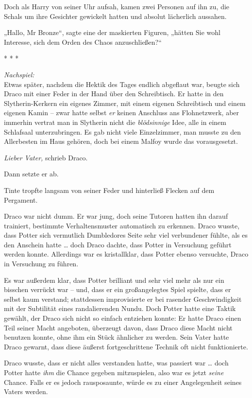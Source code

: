 {Doch als Harry von seiner Uhr aufsah, kamen zwei Personen auf ihn zu, die Schals um ihre Gesichter gewickelt hatten und absolut lächerlich aussahen.

„Hallo, Mr Bronze“, sagte eine der maskierten Figuren, „hätten Sie wohl Interesse, sich dem Orden des Chaos anzuschließen?“

* * *

\emph{Nachspiel:}\\ Etwas später, nachdem die Hektik des Tages endlich abgeflaut war, beugte sich Draco mit einer Feder in der Hand über den Schreibtisch. Er hatte in den Slytherin-Kerkern ein eigenes Zimmer, mit einem eigenen Schreibtisch und einem eigenen Kamin -- zwar hatte selbst \emph{er} keinen Anschluss ans Flohnetzwerk, aber immerhin vertrat man in Slytherin nicht die \emph{blödsinnige} Idee, alle in einem Schlafsaal unterzubringen. Es gab nicht viele Einzelzimmer, man musste zu den Allerbesten im Haus gehören, doch bei einem Malfoy wurde das vorausgesetzt.

\emph{Lieber Vater,} schrieb Draco.

Dann setzte er ab.

Tinte tropfte langsam von seiner Feder und hinterließ Flecken auf dem Pergament.

Draco war nicht dumm. Er war jung, doch seine Tutoren hatten ihn darauf trainiert, bestimmte Verhaltensmuster automatisch zu erkennen. Draco wusste, dass Potter sich vermutlich Dumbledores Seite sehr viel verbundener fühlte, als es den Anschein hatte … doch Draco dachte, dass Potter in Versuchung geführt werden konnte. Allerdings war es kristallklar, dass Potter ebenso versuchte, Draco in Versuchung zu führen.

Es war außerdem klar, dass Potter brilliant und sehr viel mehr als nur ein bisschen verrückt war -- und, dass er ein großangelegtes Spiel spielte, dass er selbst kaum verstand; stattdessen improvisierte er bei rasender Geschwindigkeit mit der Subtilität eines randalierenden Nundu. Doch Potter hatte eine Taktik gewählt, der Draco sich nicht so einfach entziehen konnte: Er hatte Draco einen Teil seiner Macht angeboten, überzeugt davon, dass Draco diese Macht nicht benutzen konnte, ohne ihm ein Stück ähnlicher zu werden. Sein Vater hatte Draco gewarnt, dass diese äußerst fortgeschrittene Technik oft nicht funktionierte.

Draco wusste, dass er nicht alles verstanden hatte, was passiert war … doch Potter hatte \emph{ihm} die Chance gegeben mitzuspielen, also war es jetzt \emph{seine} Chance. Falls er es jedoch rausposaunte, würde es zu einer Angelegenheit seines Vaters werden.

}
